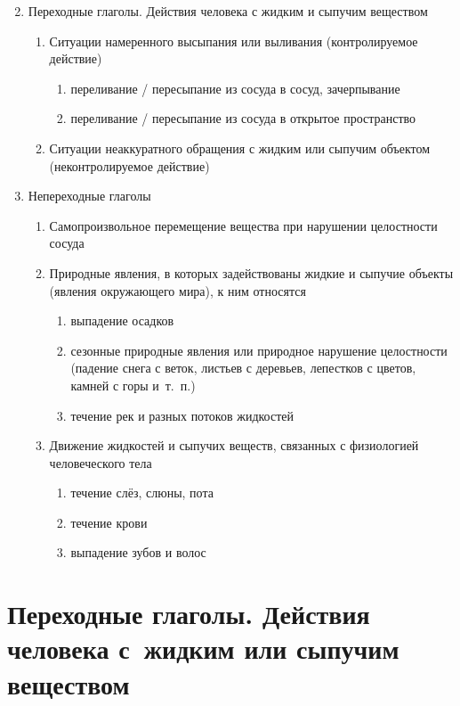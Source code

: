 \begin{enumerate}
	\setcounter{enumi}{1}
	\item Переходные глаголы. Действия человека с жидким и сыпучим веществом
	\begin{enumerate}
		\item Ситуации намеренного высыпания или выливания (контролируемое действие)
		\begin{enumerate}
			\item переливание / пересыпание из сосуда в сосуд, зачерпывание
			\item переливание / пересыпание из сосуда в открытое пространство
		\end{enumerate}
		\item Ситуации неаккуратного обращения с жидким или сыпучим объектом (неконтролируемое действие)
	\end{enumerate}
	
	\item Непереходные глаголы
	\begin{enumerate}
		\item Самопроизвольное перемещение вещества при нарушении целостности сосуда
		\item Природные явления, в которых задействованы жидкие и сыпучие объекты (явления окружающего мира), к ним относятся
		\begin{enumerate}
			\item выпадение осадков
			\item сезонные природные явления или природное нарушение целостности (падение снега с веток, листьев с деревьев, лепестков с цветов, камней с горы и~т.~п.)
			\item течение рек и разных потоков жидкостей
		\end{enumerate}
		\item Движение жидкостей и сыпучих веществ, связанных с физиологией человеческого тела
		\begin{enumerate}
			\item течение слёз, слюны, пота
			\item течение крови
			\item выпадение зубов и волос
		\end{enumerate}
	\end{enumerate}
	
\end{enumerate}

\section{Переходные глаголы. Действия человека с~жидким или сыпучим веществом} \label{pour-2}

